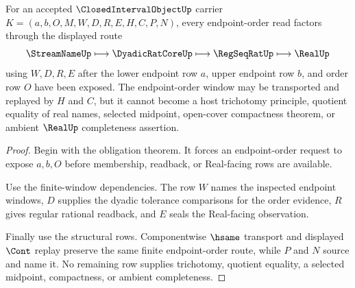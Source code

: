 \begin{theorem}
\label{thm:closed-interval-object-endpoint-order-window}
For an accepted $\ClosedIntervalObjectUp$ carrier $K=(a,b,O,M,W,D,R,E,H,C,P,N)$, every endpoint-order read factors through the displayed route
$$
\StreamNameUp \longmapsto \DyadicRatCoreUp \longmapsto \RegSeqRatUp \longmapsto \RealUp
$$
using $W,D,R,E$ after the lower endpoint row $a$, upper endpoint row $b$, and order row $O$ have been exposed. The endpoint-order window may be transported and replayed by $H$ and $C$, but it cannot become a host trichotomy principle, quotient equality of real names, selected midpoint, open-cover compactness theorem, or ambient $\RealUp$ completeness assertion.
\end{theorem}
\begin{proof}
Begin with the obligation theorem. It forces an endpoint-order request to expose $a,b,O$ before membership, readback, or Real-facing rows are available.

Use the finite-window dependencies. The row $W$ names the inspected endpoint windows, $D$ supplies the dyadic tolerance comparisons for the order evidence, $R$ gives regular rational readback, and $E$ seals the Real-facing observation.

Finally use the structural rows. Componentwise $\hsame$ transport and displayed $\Cont$ replay preserve the same finite endpoint-order route, while $P$ and $N$ source and name it. No remaining row supplies trichotomy, quotient equality, a selected midpoint, compactness, or ambient completeness.
\end{proof}

